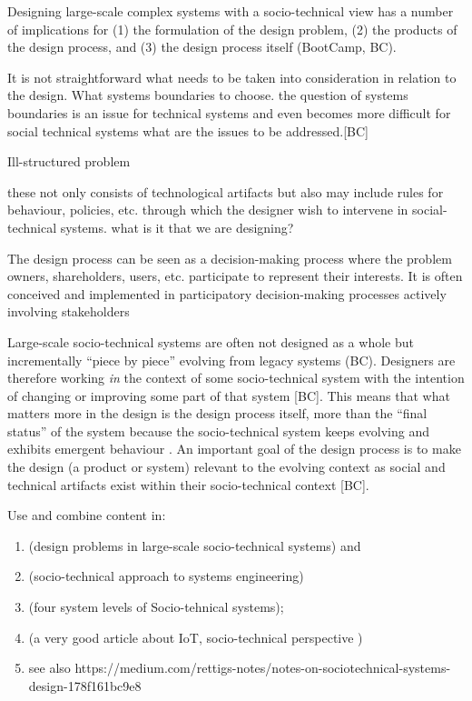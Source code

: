 \begin{svgraybox}

Designing large-scale complex systems with a socio-technical view has a number of implications for (1) the formulation of the design problem, (2) the products of the design process, and (3) the design process itself (BootCamp, BC).

 It is not straightforward what needs to be taken into consideration in relation to the design. What systems boundaries to choose. the question of systems boundaries is an issue for technical systems and even becomes more difficult for social technical systems
what are the issues to be addressed.[BC]

Ill-structured problem

 these not only consists of technological artifacts but also may include rules for behaviour, policies, etc. through which the designer wish to intervene in social-technical systems. what is it that we are designing? 

 The design process can be seen as a decision-making process where the problem owners, shareholders, users, etc. participate to represent their interests. It is often conceived and implemented in participatory decision-making processes actively involving stakeholders

Large-scale socio-technical systems are often not designed as a whole but incrementally ``piece by piece'' evolving from legacy systems (BC). Designers are therefore working \textit{in} the context of some socio-technical system with the intention of changing or improving some part of that system [BC]. This means that what matters more in the design is the design process itself, more than the ``final status'' of the system \cite{Shin2014, need more ref} because the socio-technical system keeps evolving and exhibits emergent behaviour \cite{Nikolic2009}. An important  goal of the design process is to make the design (a product or system) relevant to the evolving context \cite{Shin2014, need more ref} as social and technical artifacts exist within their socio-technical context [BC]. 

\end{svgraybox}






\begin{svgraybox}
Use and combine content in:
\begin{enumerate}
\item \cite{Norman2015} (design problems in large-scale socio-technical systems) and 
\item \cite{Baxter2011} (socio-technical approach to systems engineering)
\item \cite{Whitworth2009} (four system levels of Socio-tehnical systems); 
\item \cite{Shin2014} (a very good article about IoT, socio-technical perspective )
\item see also https://medium.com/rettigs-notes/notes-on-sociotechnical-systems-design-178f161bc9e8 
\end{enumerate}
\end{svgraybox}


